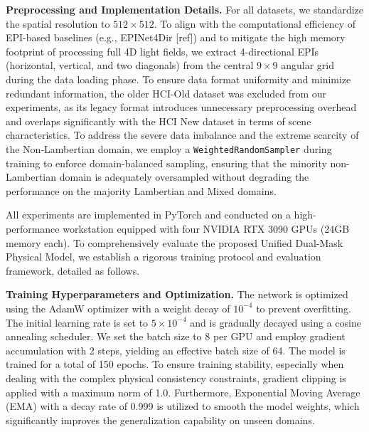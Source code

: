 \documentclass[lettersize,journal]{IEEEtran}
\begin{document}
\textbf{Preprocessing and Implementation Details.} 
For all datasets, we standardize the spatial resolution to $512 \times 512$. To align with the computational efficiency of EPI-based baselines (e.g., EPINet4Dir [ref]) and to mitigate the high memory footprint of processing full 4D light fields, we extract 4-directional EPIs (horizontal, vertical, and two diagonals) from the central $9 \times 9$ angular grid during the data loading phase. To ensure data format uniformity and minimize redundant information, the older HCI-Old dataset was excluded from our experiments, as its legacy format introduces unnecessary preprocessing overhead and overlaps significantly with the HCI New dataset in terms of scene characteristics. To address the severe data imbalance and the extreme scarcity of the Non-Lambertian domain, we employ a \texttt{WeightedRandomSampler} during training to enforce domain-balanced sampling, ensuring that the minority non-Lambertian domain is adequately oversampled without degrading the performance on the majority Lambertian and Mixed domains.

\begin{table}[t]
\centering
\caption{Summary of the Light Field Datasets Used for Training and Evaluation}
\label{tab:datasets}
\end{table}

All experiments are implemented in PyTorch and conducted on a high-performance workstation equipped with four NVIDIA RTX 3090 GPUs (24GB memory each). To comprehensively evaluate the proposed Unified Dual-Mask Physical Model, we establish a rigorous training protocol and evaluation framework, detailed as follows.

\textbf{Training Hyperparameters and Optimization.} 
The network is optimized using the AdamW optimizer with a weight decay of $10^{-4}$ to prevent overfitting. The initial learning rate is set to $5 \times 10^{-4}$ and is gradually decayed using a cosine annealing scheduler. We set the batch size to 8 per GPU and employ gradient accumulation with 2 steps, yielding an effective batch size of 64. The model is trained for a total of 150 epochs. To ensure training stability, especially when dealing with the complex physical consistency constraints, gradient clipping is applied with a maximum norm of 1.0. Furthermore, Exponential Moving Average (EMA) with a decay rate of 0.999 is utilized to smooth the model weights, which significantly improves the generalization capability on unseen domains.
\end{document}
